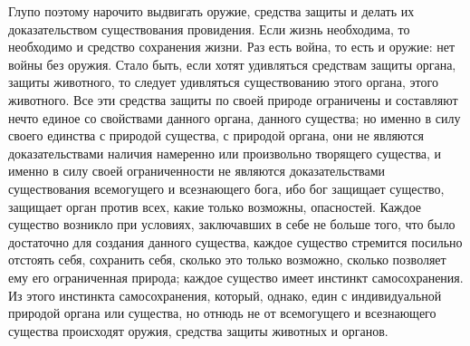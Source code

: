 \documentclass[12pt]{article}
\begin{document}
Глупо поэтому нарочито выдвигать оружие, средства защиты и делать их доказательством существования провидения. Если жизнь необходима, то необходимо и средство сохранения жизни. Раз есть война, то есть и оружие: нет войны без оружия. Стало быть, если хотят удивляться средствам защиты органа, защиты животного, то следует удивляться существованию этого органа, этого животного. Все эти средства защиты по своей природе ограничены и составляют нечто единое со свойствами данного органа, данного существа; но именно в силу своего единства с природой существа, с природой органа, они не являются доказательствами наличия намеренно или произвольно творящего существа, и именно в силу своей ограниченности не являются доказательствами существования всемогущего и всезнающего бога, ибо бог защищает существо, защищает орган против всех, какие только возможны, опасностей. Каждое существо возникло при условиях, заключавших в себе не больше того, что было достаточно для создания данного существа, каждое существо стремится посильно отстоять себя, сохранить себя, сколько это только возможно, сколько позволяет ему его ограниченная природа; каждое существо имеет инстинкт самосохранения. Из этого инстинкта самосохранения, который, однако, един с индивидуальной природой органа или существа, но отнюдь не от всемогущего и всезнающего существа происходят оружия, средства защиты животных и органов. 
\end{document}
